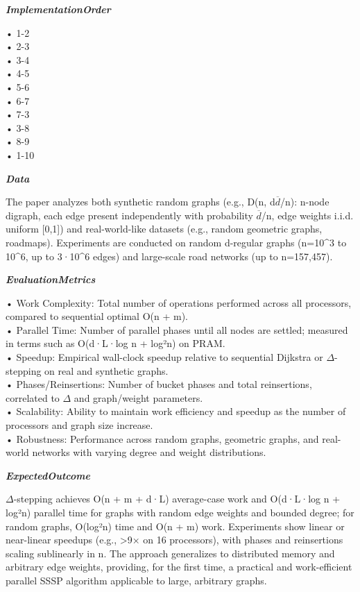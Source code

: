 \begin{tcolorbox}[
    breakable,
    title={Example of Idea Generation in Math},
    colback=LighterGray,
    colframe=DeepPurple,
    colbacktitle=DeepPurple,
    coltitle=White,
]
\textbf{\emph{\textcolor{CaseOrange}{ImplementationOrder}}}

• 1-2 \\
• 2-3 \\
• 3-4 \\
• 4-5 \\
• 5-6 \\
• 6-7 \\
• 7-3 \\
• 3-8 \\
• 8-9 \\
• 1-10 

\textbf{\emph{\textcolor{CaseOrange}{Data}}}

The paper analyzes both synthetic random graphs (e.g., D(n, d$\overline{d}$/n): n-node digraph, each edge present
independently with probability $\overline{d}$/n, edge weights i.i.d. uniform [0,1]) and real-world-like datasets
(e.g., random geometric graphs, roadmaps). Experiments are conducted on random d-regular graphs
(n=10\^{}3 to 10\^{}6, up to 3·10\^{}6 edges) and large-scale road networks (up to n=157,457).

\textbf{\emph{\textcolor{CaseOrange}{EvaluationMetrics}}}

• Work Complexity: Total number of operations performed across all processors, compared to sequential optimal O(n + m). \\
• Parallel Time: Number of parallel phases until all nodes are settled; measured in terms such as O(d·L·log n + log²n) on PRAM. \\
• Speedup: Empirical wall-clock speedup relative to sequential Dijkstra or $\Delta$-stepping on real and synthetic graphs. \\
• Phases/Reinsertions: Number of bucket phases and total reinsertions, correlated to $\Delta$ and graph/weight parameters. \\
• Scalability: Ability to maintain work efficiency and speedup as the number of processors and graph size increase. \\
• Robustness: Performance across random graphs, geometric graphs, and real-world networks with varying degree and weight distributions. 

\textbf{\emph{\textcolor{CaseOrange}{ExpectedOutcome}}}

$\Delta$-stepping achieves O(n + m + d·L) average-case work and O(d·L·log n + log²n) parallel time for
graphs with random edge weights and bounded degree; for random graphs, O(log²n) time and O(n + m)
work. Experiments show linear or near-linear speedups (e.g., >9× on 16 processors), with phases and
reinsertions scaling sublinearly in n. The approach generalizes to distributed memory and arbitrary
edge weights, providing, for the first time, a practical and work-efficient parallel SSSP algorithm
applicable to large, arbitrary graphs.

\end{tcolorbox}


